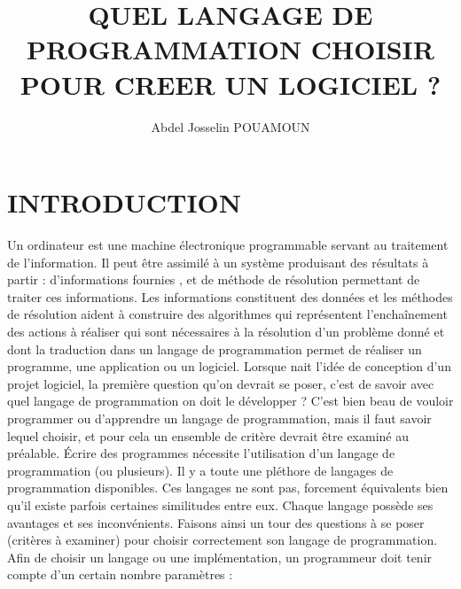 \documentclass[a4paper,12pt]{article} %
\title{QUEL LANGAGE DE PROGRAMMATION CHOISIR POUR CREER UN LOGICIEL ?} %
\author{Abdel Josselin POUAMOUN} %
\date{} %
\begin{document}
\maketitle %

\section{INTRODUCTION} %
Un ordinateur est une machine électronique programmable servant au traitement de l'information. Il peut être  assimilé à un système produisant des résultats à partir : d'informations fournies , et de méthode de résolution permettant de traiter ces informations.
Les informations constituent des données et les méthodes de résolution aident à construire des algorithmes qui représentent l'enchaînement des actions à réaliser qui sont nécessaires à la résolution d'un problème donné et dont la traduction dans un langage de programmation permet de réaliser un programme, une application ou un logiciel.
Lorsque nait l’idée de conception d’un projet logiciel, la première question qu’on devrait se poser, c’est de savoir avec quel langage de programmation  on doit le développer ? 
C’est bien beau de vouloir programmer ou d’apprendre un langage de programmation, mais il faut savoir lequel choisir, et pour cela un ensemble de  critère devrait être examiné au préalable.
Écrire des programmes nécessite l'utilisation d'un langage de programmation (ou plusieurs). Il y a toute une pléthore de langages de programmation disponibles. Ces langages ne sont pas, forcement équivalents bien qu’il existe parfois certaines similitudes entre eux. Chaque langage possède ses avantages et ses inconvénients.
Faisons ainsi un tour des questions à se poser (critères à examiner) pour choisir correctement son langage de programmation.
Afin de choisir un langage ou une implémentation, un programmeur doit tenir compte d'un certain nombre paramètres :
\end{document}
